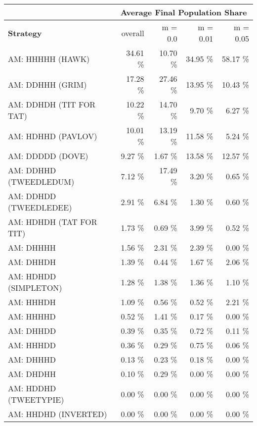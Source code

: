 \begin{tabular}{|l|r|r|r|r|}
\hline
 & \multicolumn{4}{c|}{{\bf Average Final Population Share}} \\
\hline
{\bf Strategy} & overall &  m = 0.0 & m = 0.01 & m = 0.05\\ \hline
AM: HHHHH (HAWK)             &   34.61 \%  &   10.70 \%  &   34.95 \%  &   58.17 \% \\
AM: DDHHH (GRIM)             &   17.28 \%  &   27.46 \%  &   13.95 \%  &   10.43 \% \\
AM: DDHDH (TIT FOR TAT)      &   10.22 \%  &   14.70 \%  &    9.70 \%  &    6.27 \% \\
AM: HDHHD (PAVLOV)           &   10.01 \%  &   13.19 \%  &   11.58 \%  &    5.24 \% \\
AM: DDDDD (DOVE)             &    9.27 \%  &    1.67 \%  &   13.58 \%  &   12.57 \% \\
AM: DDHHD (TWEEDLEDUM)       &    7.12 \%  &   17.49 \%  &    3.20 \%  &    0.65 \% \\
AM: DDHDD (TWEEDLEDEE)       &    2.91 \%  &    6.84 \%  &    1.30 \%  &    0.60 \% \\
AM: HDHDH (TAT FOR TIT)      &    1.73 \%  &    0.69 \%  &    3.99 \%  &    0.52 \% \\
AM: DHHHH                    &    1.56 \%  &    2.31 \%  &    2.39 \%  &    0.00 \% \\
AM: DHHDH                    &    1.39 \%  &    0.44 \%  &    1.67 \%  &    2.06 \% \\
AM: HDHDD (SIMPLETON)        &    1.28 \%  &    1.38 \%  &    1.36 \%  &    1.10 \% \\
AM: HHHDH                    &    1.09 \%  &    0.56 \%  &    0.52 \%  &    2.21 \% \\
AM: HHHHD                    &    0.52 \%  &    1.41 \%  &    0.17 \%  &    0.00 \% \\
AM: DHHDD                    &    0.39 \%  &    0.35 \%  &    0.72 \%  &    0.11 \% \\
AM: HHHDD                    &    0.36 \%  &    0.29 \%  &    0.75 \%  &    0.06 \% \\
AM: DHHHD                    &    0.13 \%  &    0.23 \%  &    0.18 \%  &    0.00 \% \\
AM: DHDHH                    &    0.10 \%  &    0.29 \%  &    0.00 \%  &    0.00 \% \\
AM: HDDHD (TWEETYPIE)        &    0.00 \%  &    0.00 \%  &    0.00 \%  &    0.00 \% \\
AM: HHDHD (INVERTED)         &    0.00 \%  &    0.00 \%  &    0.00 \%  &    0.00 \% \\

\end{tabular}
